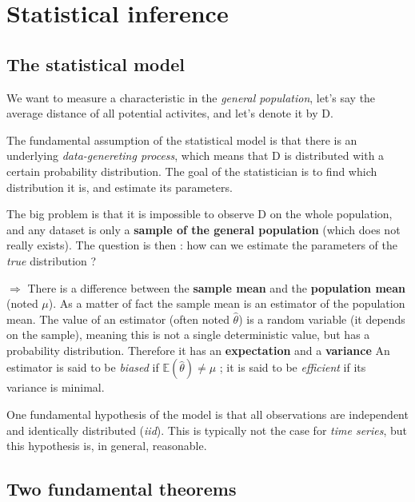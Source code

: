 \documentclass[
]{book}
\begin{document}
\hypertarget{stat_inf}{%
\section{Statistical inference}\label{stat_inf}}

\hypertarget{the-statistical-model}{%
\subsection{The statistical model}\label{the-statistical-model}}

We want to measure a characteristic in the \emph{general population}, let's say the average distance of all potential activites, and let's denote it by D.

The fundamental assumption of the statistical model is that there is an underlying \emph{data-genereting process}, which means that D is distributed with a certain probability distribution. The goal of the statistician is to find which distribution it is, and estimate its parameters.

The big problem is that it is impossible to observe D on the whole population, and any dataset is only a \textbf{sample of the general population} (which does not really exists). The question is then : how can we estimate the parameters of the \emph{true} distribution ?

\(\Rightarrow\) There is a difference between the \textbf{sample mean} and the \textbf{population mean} (noted \(\mu\)).
As a matter of fact the sample mean is an estimator of the population mean. The value of an estimator (often noted \(\hat{\theta}\)) is a random variable (it depends on the sample), meaning this is not a single deterministic value, but has a probability distribution. Therefore it has an \textbf{expectation} and a \textbf{variance}
An estimator is said to be \emph{biased} if \(\mathbb{E}(\hat{\theta}) \neq \mu\) ; it is said to be \emph{efficient} if its variance is minimal.

One fundamental hypothesis of the model is that all observations are independent and identically distributed (\emph{iid}). This is typically not the case for \emph{time series}, but this hypothesis is, in general, reasonable.

\hypertarget{two-fundamental-theorems}{%
\subsection{Two fundamental theorems}\label{two-fundamental-theorems}}
\end{document}
